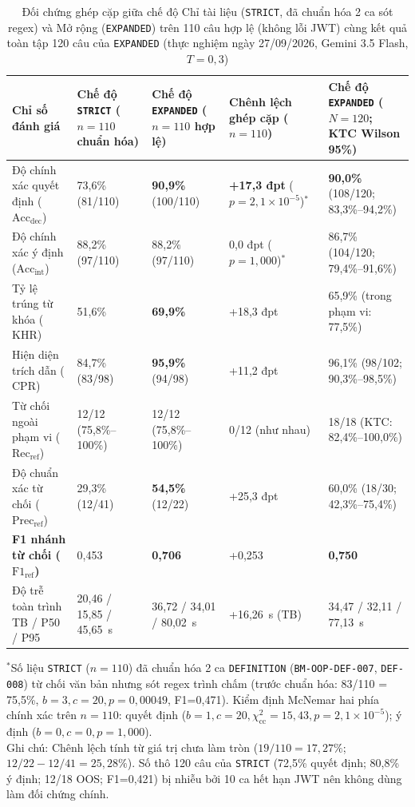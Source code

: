 \documentclass{IEEEtran}
\begin{document}
\begin{table}[t]
\caption{Đối chứng ghép cặp giữa chế độ Chỉ tài liệu (\texttt{STRICT}, đã chuẩn hóa 2 ca sót regex) và Mở rộng (\texttt{EXPANDED}) trên 110 câu hợp lệ (không lỗi JWT) cùng kết quả toàn tập 120 câu của \texttt{EXPANDED} (thực nghiệm ngày 27/09/2026, Gemini 3.5 Flash, $T=0{,}3$)}
\label{tab:rag_benchmark}
\centering
\scriptsize
\setlength{\tabcolsep}{4pt}
\begin{tabularx}{\textwidth}{|Y|C{2.65cm}|C{2.65cm}|C{2.95cm}|C{3.35cm}|}
\hline
\textbf{Chỉ số đánh giá} & \textbf{Chế độ \texttt{STRICT} ($n=110$ chuẩn hóa)} & \textbf{Chế độ \texttt{EXPANDED} ($n=110$ hợp lệ)} & \textbf{Chênh lệch ghép cặp ($n=110$)} & \textbf{Chế độ \texttt{EXPANDED} ($N=120$; KTC Wilson 95\%)} \\
\hline
Độ chính xác quyết định ($\text{Acc}_{\text{dec}}$) & 73,6\% (81/110) & \textbf{90,9\%} (100/110) & \textbf{+17,3 đpt} ($p=2{,}1{\times}10^{-5}$)$^{*}$ & \textbf{90,0\%} (108/120; 83,3\%--94,2\%) \\
Độ chính xác ý định ($\text{Acc}_{\text{int}}$) & 88,2\% (97/110) & 88,2\% (97/110) & 0,0 đpt ($p=1{,}000$)$^{*}$ & 86,7\% (104/120; 79,4\%--91,6\%) \\
Tỷ lệ trúng từ khóa ($\text{KHR}$) & 51,6\% & \textbf{69,9\%} & +18,3 đpt & 65,9\% (trong phạm vi: 77,5\%) \\
Hiện diện trích dẫn ($\text{CPR}$) & 84,7\% (83/98) & \textbf{95,9\%} (94/98) & +11,2 đpt & 96,1\% (98/102; 90,3\%--98,5\%) \\
Từ chối ngoài phạm vi ($\text{Rec}_{\text{ref}}$) & 12/12 (75,8\%--100\%) & 12/12 (75,8\%--100\%) & 0/12 (như nhau) & 18/18 (KTC: 82,4\%--100,0\%) \\
Độ chuẩn xác từ chối ($\text{Prec}_{\text{ref}}$) & 29,3\% (12/41) & \textbf{54,5\%} (12/22) & +25,3 đpt & 60,0\% (18/30; 42,3\%--75,4\%) \\
\textbf{F1 nhánh từ chối ($\text{F1}_{\text{ref}}$)} & 0,453 & \textbf{0,706} & +0,253 & \textbf{0,750} \\
Độ trễ toàn trình TB / P50 / P95 & 20,46 / 15,85 / 45,65~s & 36,72 / 34,01 / 80,02~s & +16,26~s (TB) & 34,47 / 32,11 / 77,13~s \\
\hline
\end{tabularx}
\vspace{2pt}
\begin{minipage}{\textwidth}
\scriptsize
$^{*}$Số liệu \texttt{STRICT} ($n=110$) đã chuẩn hóa 2 ca \texttt{DEFINITION} (\texttt{BM-OOP-DEF-007}, \texttt{DEF-008}) từ chối văn bản nhưng sót regex trình chấm (trước chuẩn hóa: 83/110 = 75,5\%, $b=3, c=20, p=0{,}00049$, F1=0,471). Kiểm định McNemar hai phía chính xác trên $n=110$: quyết định ($b=1, c=20, \chi^2_{\text{cc}}=15{,}43, p=2{,}1\times 10^{-5}$); ý định ($b=0, c=0, p=1{,}000$).\\
Ghi chú: Chênh lệch tính từ giá trị chưa làm tròn ($19/110 = 17{,}27\%$; $12/22 - 12/41 = 25{,}28\%$). Số thô 120 câu của \texttt{STRICT} (72,5\% quyết định; 80,8\% ý định; 12/18 OOS; F1=0,421) bị nhiễu bởi 10 ca hết hạn JWT nên không dùng làm đối chứng chính.
\end{minipage}
\end{table}
\end{document}
